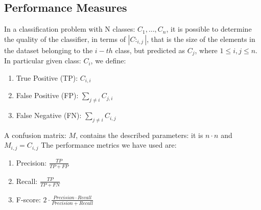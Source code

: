 \documentclass[LaM,binding=0.6cm]{sapthesis}
\begin{document}
\subsection{Performance Measures}
In a classification problem with N classes: ${C_1,\dots,C_n}$, it is possible to determine the quality of the classifier, in terms of $|C:_{i,j}|$, that is the size of the elements in the dataset belonging to the $i-th$ class, but predicted as $C_j$, where $1 \leq i,j \leq n$.\\In particular given class: $C_i$, we define:
\begin{enumerate}
\item True Positive (TP): $C_{i,i}$%
\item False Positive (FP): $\sum_{j\neq i}C_{j,i}$
\item False Negative (FN): $\sum_{j\neq i}C_{i,j}$
\end{enumerate}
A confusion matrix: $M$, contains the described parameters: it is $n\cdot n$ and $M_{i,j}=C_{i,j}$
The performance metrics we have used are:
\begin{enumerate}
\item Precision: $\frac{TP}{TP+FP}$
\item Recall: $\frac{TP}{TP+FN}$
\item F-score: $2\cdot \frac{Precision\cdot Recall}{Precision+Recall}$
\end{enumerate}
\end{document}
